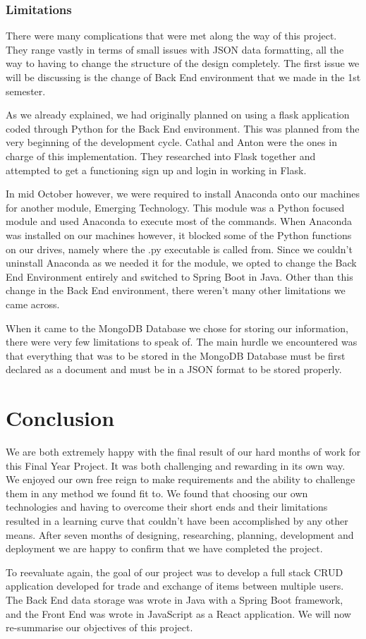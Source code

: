 \subsection{Limitations}
There were many complications that were met along the way of this project. They range vastly in terms of small issues with JSON data formatting, all the way to having to change the structure of the design completely. The first issue we will be discussing is the change of Back End environment that we made in the 1st semester. \par
As we already explained, we had originally planned on using a flask application coded through Python for the Back End environment. This was planned from the very beginning of the development cycle. Cathal and Anton were the ones in charge of this implementation. They researched into Flask together and attempted to get a functioning sign up and login in working in Flask. \par
In mid October however, we were required to install Anaconda onto our machines for another module, Emerging Technology. This module was a Python focused module and used Anaconda to execute most of the commands. When Anaconda was installed on our machines however, it blocked some of the Python functions on our drives, namely where the .py executable is called from. Since we couldn't uninstall Anaconda as we needed it for the module, we opted to change the Back End Environment entirely and switched to Spring Boot in Java. Other than this change in the Back End environment, there weren't many other limitations we came across. \par
When it came to the MongoDB Database we chose for storing our information, there were very few limitations to speak of. The main hurdle we encountered was that everything that was to be stored in the MongoDB Database must be first declared as a document and must be in a JSON format to be stored properly.
\chapter{Conclusion}
We are both extremely happy with the final result of our hard months of work for this Final Year Project. It was both challenging and rewarding in its own way. We enjoyed our own free reign to make requirements and the ability to challenge them in any method we found fit to. We found that choosing our own technologies and having to overcome their short ends and their limitations resulted in a learning curve that couldn't have been accomplished by any other means. After seven months of designing, researching, planning, development and deployment we are happy to confirm that we have completed the project. \par
To reevaluate again, the goal of our project was to develop a full stack CRUD application developed for trade and exchange of items between multiple users. The Back End data storage was wrote in Java with a Spring Boot framework, and the Front End was wrote in JavaScript as a React application. We will now re-summarise our objectives of this project. \par

